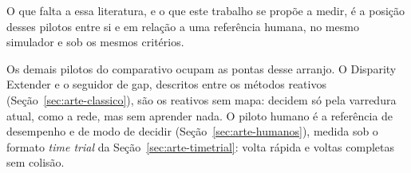 O que falta a essa literatura, e o que este trabalho se propõe a medir, é a
posição desses pilotos entre si e em relação a uma referência humana, no mesmo
simulador e sob os mesmos critérios.

Os demais pilotos do comparativo ocupam as pontas desse arranjo. O Disparity
Extender e o seguidor de gap, descritos entre os métodos reativos
(Seção~\ref{sec:arte-classico}), são os reativos sem mapa: decidem só pela
varredura atual, como a rede, mas sem aprender nada. O
piloto humano é a referência de desempenho e de modo de decidir
(Seção~\ref{sec:arte-humanos}), medida sob o formato \textit{time trial} da
Seção~\ref{sec:arte-timetrial}: volta rápida e voltas completas sem colisão.
